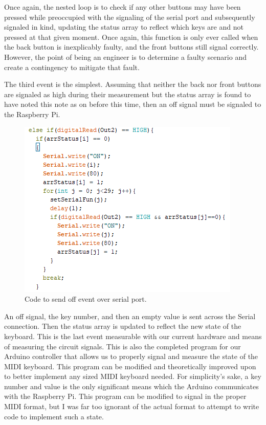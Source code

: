 Once again, the nested loop is to check if any other buttons may have been pressed while
preoccupied with the signaling of the serial port and subsequently signaled in kind,
updating the status array to reflect which keys are and not pressed at that given moment.
Once again, this function is only ever called when the back button is inexplicably faulty,
and the front buttons still signal correctly. However, the point of being an engineer is
to determine a faulty scenario and create a contingency to mitigate that fault.

The third event is the simplest. Assuming that neither the back nor front buttons are
signaled as high during their measurement but the status array is found to have noted this
note as on before this time, then an off signal must be signaled to the Raspberry Pi.

\begin{figure}[h!]
  \centering
  \includegraphics{image/backupfunction.png}
  \caption{Code to send off event over serial port.}
\end{figure}

An off signal, the key number, and then an empty value is sent across the Serial
connection. Then the status array is updated to reflect the new state of the keyboard.
This is the last event measurable with our current hardware and means of measuring the
circuit signals. This is also the completed program for our Arduino controller that allows
us to properly signal and measure the state of the MIDI keyboard. This program can be
modified and theoretically improved upon to better implement any sized MIDI keyboard
needed. For simplicity’s sake, a key number and value is the only significant means which
the Arduino communicates with the Raspberry Pi. This program can be modified to signal in
the proper MIDI format, but I was far too ignorant of the actual format to attempt to
write code to implement such a state.

